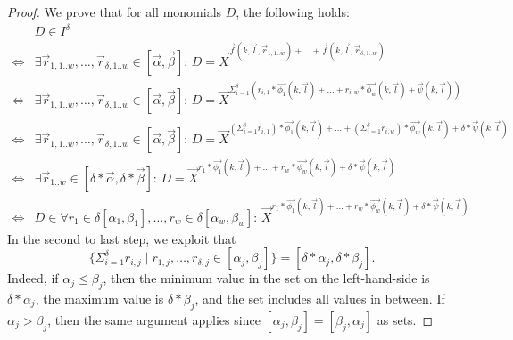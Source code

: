 \begin{proof}
We prove that for all monomials $D$, the following holds:
\begin{align*}
   & D \in I^{\delta} \\
%
{}\Leftrightarrow{} &
  \exists \vec{r}_{1,1..w},\ldots,\vec{r}_{\delta,1..w} \in [\vec{\alpha}, \vec{\beta}]:\,
    D = \vec{X}^{\vec{f}(k,\vec{l},\vec{r}_{1,1..w}) + \ldots + \vec{f}(k,\vec{l},\vec{r}_{\delta,1..w}) } \\
%
{}\Leftrightarrow{} &
  \exists \vec{r}_{1,1..w},\ldots,\vec{r}_{\delta,1..w} \in [\vec{\alpha}, \vec{\beta}]:\,
    D = \vec{X}^{ \Sigma_{i=1}^{\delta} (r_{i,1}*\vec{\phi_1}(k,\vec{l}) + \ldots + r_{i,w}*\vec{\phi_w}(k,\vec{l})
                  + \vec{\psi}(k,\vec{l}))
                } \\
{}\Leftrightarrow{} &
  \exists \vec{r}_{1,1..w},\ldots,\vec{r}_{\delta,1..w} \in [\vec{\alpha}, \vec{\beta}]:\,
    D = \vec{X}^{   (\Sigma_{i=1}^{\delta} r_{i,1})*\vec{\phi_1}(k,\vec{l}) + \ldots
                  + (\Sigma_{i=1}^{\delta} r_{i,w})*\vec{\phi_w}(k,\vec{l})
                  + \delta*\vec{\psi}(k,\vec{l})
                } \\
{}\Leftrightarrow{} &
  \exists \vec{r}_{1..w} \in [\delta * \vec{\alpha}, \delta * \vec{\beta}]:\,
    D = \vec{X}^{   r_{1}*\vec{\phi_1}(k,\vec{l}) + \ldots
                  + r_{w}*\vec{\phi_w}(k,\vec{l})
                  + \delta*\vec{\psi}(k,\vec{l})
                } \\
{}\Leftrightarrow{} &
  D \in \forall r_1 \in \delta[\alpha_1, \beta_1], \ldots, r_w \in \delta[\alpha_w, \beta_w]:\,
    \vec{X}^{r_{1}*\vec{\phi_1}(k,\vec{l}) + \ldots + r_{w}*\vec{\phi_w}(k,\vec{l}) + \delta*\vec{\psi}(k,\vec{l})}
%
\end{align*}
In the second to last step, we exploit that
\[
   \{ \Sigma_{i=1}^{\delta} r_{i,j} \mid r_{1,j}, \ldots, r_{\delta,j} \in [\alpha_j, \beta_j] \}
   = [\delta*\alpha_j, \delta*\beta_j]\text{.}
\]
Indeed, if $\alpha_j \leq \beta_j$, then the minimum value in the set on the left-hand-side
  is $\delta*\alpha_j$, the maximum value is $\delta*\beta_j$, and the set includes all
  values in between.
If $\alpha_j > \beta_j$, then the same argument applies since $[\alpha_j,\beta_j] = [\beta_j,\alpha_j]$
  as sets.  
\end{proof}
